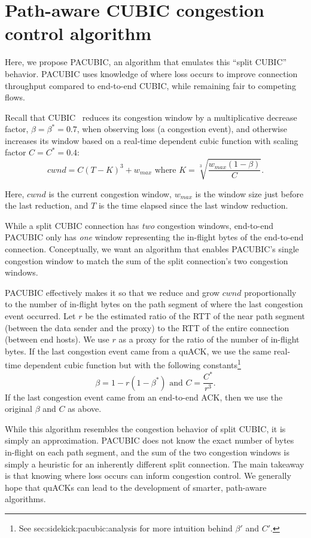 \section{Path-aware CUBIC congestion control algorithm}
\label{sec:sidekick:pacubic}

Here, we propose PACUBIC, an algorithm that emulates this ``split CUBIC''
behavior. PACUBIC uses knowledge of where loss occurs to improve connection
throughput compared to end-to-end CUBIC, while remaining fair to competing flows.

Recall that CUBIC~\cite{ha2008cubic} reduces its congestion window by a
multiplicative decrease factor,
$\beta = \beta^* = 0.7$, when observing loss (a congestion event), and otherwise
increases its window based on a real-time dependent cubic function with scaling
factor $C=C^*=0.4$:
\[
cwnd = C(T-K)^3 + w_{max} \text{ where } K = \sqrt[3]{\frac{w_{max}(1-\beta)}{C}}.
\]

\noindent Here, $cwnd$ is the current congestion window,
$w_{max}$ is the window size just before the last reduction,
and $T$ is the time elapsed since the last window reduction.

While a split CUBIC connection has \emph{two} congestion windows,
end-to-end PACUBIC only has \emph{one} window representing the in-flight bytes
of the end-to-end connection.
Conceptually, we want an algorithm that enables PACUBIC's single
congestion window to match the sum of the split connection's two congestion
windows.

PACUBIC effectively makes it so that we reduce and grow $cwnd$
proportionally to the number of in-flight bytes on the path segment
of where the last congestion event occurred.
Let $r$ be the estimated ratio of the RTT of the near path segment
(between the data sender and the proxy) to the RTT of the entire connection
(between end hosts).
We use $r$ as a proxy for the ratio of the number of in-flight bytes. If the
last congestion event came from a quACK, we use the same real-time dependent
cubic function but with the following constants\footnote{See \Cref
{sec:sidekick:pacubic:analysis} for more intuition behind $\beta'$ and $C'$.}
\[
\beta = 1 - r(1-\beta^*)\text{ and }C = \frac{C^*}{r^3}.
\]
\noindent If the last congestion event came from an end-to-end ACK, then we use
the original $\beta$ and $C$ as above.

While this algorithm resembles the congestion behavior of split CUBIC, it is
simply an approximation. PACUBIC does not know the exact number of bytes
in-flight on each path segment, and the sum of the two congestion windows is
simply a heuristic for an inherently different split connection. The main
takeaway is that knowing where loss occurs can inform congestion control. We
generally hope that quACKs can lead to the development of smarter, path-aware
algorithms.

